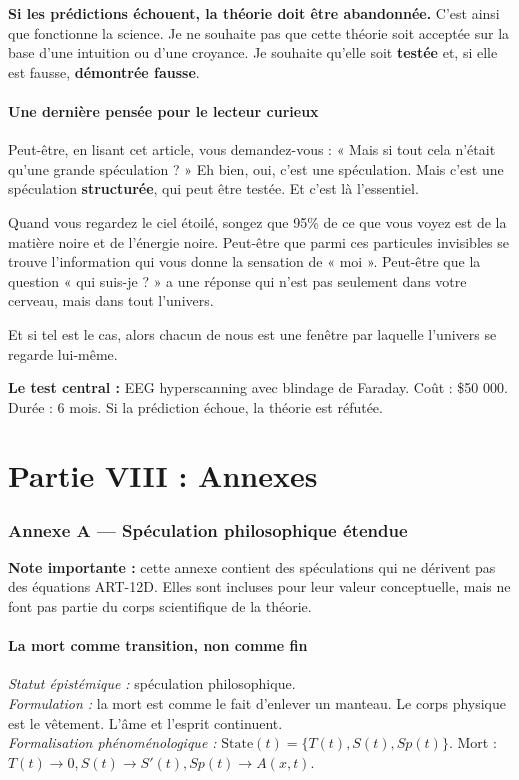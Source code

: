 \textbf{Si les prédictions échouent, la théorie doit être abandonnée.} C'est ainsi que fonctionne la science. Je ne souhaite pas que cette théorie soit acceptée sur la base d'une intuition ou d'une croyance. Je souhaite qu'elle soit \textbf{testée} et, si elle est fausse, \textbf{démontrée fausse}.

\subsection{Une dernière pensée pour le lecteur curieux}
Peut-être, en lisant cet article, vous demandez-vous : « Mais si tout cela n'était qu'une grande spéculation ? » Eh bien, oui, c'est une spéculation. Mais c'est une spéculation \textbf{structurée}, qui peut être testée. Et c'est là l'essentiel.

Quand vous regardez le ciel étoilé, songez que 95\% de ce que vous voyez est de la matière noire et de l'énergie noire. Peut-être que parmi ces particules invisibles se trouve l'information qui vous donne la sensation de « moi ». Peut-être que la question « qui suis-je ? » a une réponse qui n'est pas seulement dans votre cerveau, mais dans tout l'univers.

Et si tel est le cas, alors chacun de nous est une fenêtre par laquelle l'univers se regarde lui-même.

\textbf{Le test central :} EEG hyperscanning avec blindage de Faraday. Coût : \$50 000. Durée : 6 mois. Si la prédiction échoue, la théorie est réfutée.

\newpage
\part*{Partie VIII : Annexes}

\section{Annexe A --- Spéculation philosophique étendue}
\textbf{Note importante :} cette annexe contient des spéculations qui ne dérivent pas des équations ART-12D. Elles sont incluses pour leur valeur conceptuelle, mais ne font pas partie du corps scientifique de la théorie.

\subsection{La mort comme transition, non comme fin}
\textit{Statut épistémique :} spéculation philosophique. \\
\textit{Formulation :} la mort est comme le fait d'enlever un manteau. Le corps physique est le vêtement. L'âme et l'esprit continuent. \\
\textit{Formalisation phénoménologique :} $\text{State}(t) = \{ T(t), S(t), Sp(t) \}$. Mort : $T(t) \to 0, S(t) \to S'(t), Sp(t) \to A(x,t)$.

